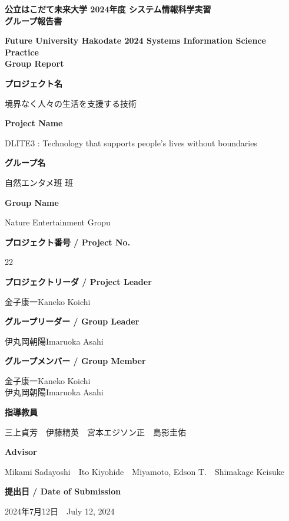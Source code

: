 \documentclass[11pt,a4paper]{report}
\newcommand{\AgendaBox}[2]{
    \large
    \textbf{#1}\\

    \vspace{0.2cm}

    \small 
    #2

    \vspace{0.5cm}
}
\newcommand{\NameBox}[2]{
    \small 
    #1\hspace{1cm}#2
}
\begin{document}
\thispagestyle{empty}
\begin{center}
    \large
    \textbf{
      公立はこだて未来大学 2024年度 システム情報科学実習\\
      グループ報告書
    }\\

    \vspace{0.2cm}

    \small 
    \textbf{
      Future University Hakodate 2024 Systems Information Science Practice\\Group Report
    }

    \vspace{0.5cm}

    \AgendaBox{プロジェクト名}{境界なく人々の生活を支援する技術}
    \AgendaBox{Project Name}{DLITE3 : Technology that supports people's lives without boundaries}
    \AgendaBox{グループ名}{自然エンタメ班 班}
    \AgendaBox{Group Name}{Nature Entertainment Gropu}
    \AgendaBox{プロジェクト番号 / Project No.}{22}
    \AgendaBox{プロジェクトリーダ / Project Leader}{金子康一\hspace{1cm}Kaneko Koichi}
    \AgendaBox{グループリーダー / Group Leader}{
      \NameBox{伊丸岡朝陽}{Imaruoka Asahi}\\
    }
    \AgendaBox{グループメンバー / Group Member}{
      \NameBox{金子康一}{Kaneko Koichi}\\
      \NameBox{伊丸岡朝陽}{Imaruoka Asahi}\\
    }
    \AgendaBox{指導教員}{
      三上貞芳　伊藤精英　宮本エジソン正　島影圭佑
    }
    \AgendaBox{Advisor}{
      Mikami Sadayoshi　Ito Kiyohide　Miyamoto, Edson T.　Shimakage Keisuke
    }
    \AgendaBox{提出日 / Date of Submission}{
      2024年7月12日　July 12, 2024
    }
    

\end{center}

\newpage
\thispagestyle{empty}
\mbox{}
\newpage

\clearpage
{}
\setcounter{page}{1}
\end{document}

